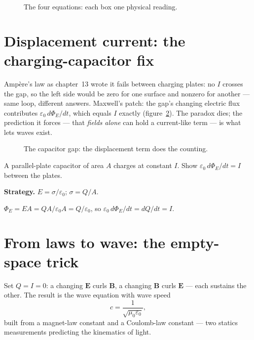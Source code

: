 \begin{figure}[htbp]\centering

\caption{The four equations: each box one physical reading.}
\label{fig:four}
\end{figure}

\section{Displacement current: the charging-capacitor fix}\label{sec:max-displ}

Amp\`ere's law as chapter~13 wrote it fails between charging plates:
no $I$ crosses the gap, so the left side would be zero for one surface
and nonzero for another --- same loop, different answers. Maxwell's
patch: the gap's changing electric flux contributes
$\varepsilon_0\,d\Phi_E/dt$, which equals $I$ exactly
(figure~\ref{fig:displ}). The paradox dies; the prediction it forces
--- that \emph{fields alone} can hold a current-like term --- is what
lets waves exist.

\begin{figure}[htbp]\centering

\caption{The capacitor gap: the displacement term does the counting.}
\label{fig:displ}
\end{figure}

\begin{example}\label{ex:displ}
A parallel-plate capacitor of area $A$ charges at constant $I$. Show
$\varepsilon_0\,d\Phi_E/dt=I$ between the plates.
\par\smallskip
\textbf{Strategy.} $E=\sigma/\varepsilon_0$; $\sigma=Q/A$.
\begin{solution}
$\Phi_E=EA=QA/\varepsilon_0A=Q/\varepsilon_0$, so
$\varepsilon_0\,d\Phi_E/dt=dQ/dt=I$. \checkmark
\end{solution}
\end{example}

\section{From laws to wave: the empty-space trick}\label{sec:max-wave}

Set $Q=I=0$: a changing $\mathbf E$ curls $\mathbf B$, a changing
$\mathbf B$ curls $\mathbf E$ --- each sustains the other. The
result is the wave equation with wave speed
\begin{equation}
  c=\frac{1}{\sqrt{\mu_0\varepsilon_0}},\label{eq:c}
\end{equation}
built from a magnet-law constant and a Coulomb-law constant --- two
statics measurements predicting the kinematics of light.

